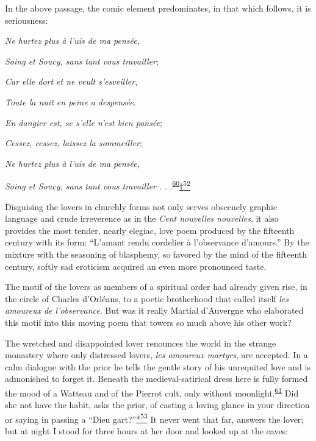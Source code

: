 In the above passage, the comic element predominates, in that which
follows, it is seriousness:

\emph{Ne hurtez plus à l'uis de ma pensée},

\emph{Soing et Soucy, sans tant vous travailler};

\emph{Car elle dort et ne veult s'esveiller},

\emph{Toute la nuit en peine a despensée}.

\emph{En dangier est, se s'elle n'est bien pansée};

\emph{Cessez, cessez, laissez la sommeiller};

\emph{Ne hurtez plus à l'uis de ma pensée},

\emph{Soing et Soucy, sans tant vous travailler .} .
.\textsuperscript{\protect\hypertarget{21_Chapter_Thirteen__IMAGE_AND_WORD.xhtmlux5cux23id_192}{\protect\hyperlink{23_NOTES.xhtmlux5cux23id_193}{60}}}\protect\hypertarget{21_Chapter_Thirteen__IMAGE_AND_WORD.xhtmlux5cux23id_2849}{\protect\hyperlink{23_NOTES.xhtmlux5cux23id_2850}{†\textsuperscript{52}}}

\protect\hypertarget{21_Chapter_Thirteen__IMAGE_AND_WORD.xhtmlux5cux23page_370}{}{}Disguising
the lovers in churchly forms not only serves obscenely graphic language
and crude irreverence as in the \emph{Cent nouvelles nouvelles}, it also
provides the most tender, nearly elegiac, love poem produced by the
fifteenth century with its form: ``L'amant rendu cordelier à
l'observance d'amours.'' By the mixture with the seasoning of blasphemy,
so favored by the mind of the fifteenth century, softly sad eroticism
acquired an even more pronounced taste.

The motif of the lovers as members of a spiritual order had already
given rise, in the circle of Charles d'Orléans, to a poetic brotherhood
that called itself \emph{les amoureux de l'observance}. But was it
really Martial d'Auvergne who elaborated this motif into this moving
poem that towers so much above his other work?

The wretched and disappointed lover renounces the world in the strange
monastery where only distressed lovers, \emph{les amoureux martyrs}, are
accepted. In a calm dialogue with the prior he tells the gentle story of
his unrequited love and is admonished to forget it. Beneath the
medieval-satirical dress here is fully formed the mood of a Watteau and
of the Pierrot cult, only without
moonlight.\textsuperscript{\protect\hypertarget{21_Chapter_Thirteen__IMAGE_AND_WORD.xhtmlux5cux23id_190}{\protect\hyperlink{23_NOTES.xhtmlux5cux23id_191}{61}}}
Did she not have the habit, asks the prior, of casting a loving glance
in your direction or saying in passing a ``Dieu
gart?''\protect\hypertarget{21_Chapter_Thirteen__IMAGE_AND_WORD.xhtmlux5cux23id_2847}{\protect\hyperlink{23_NOTES.xhtmlux5cux23id_2848}{*\textsuperscript{53}}}
It never went that far, answers the lover; but at night I stood for
three hours at her door and looked up at the eaves:

